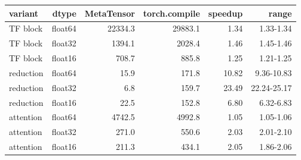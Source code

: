 \begin{tabular}{lrrrrr}
\toprule
variant & dtype & MetaTensor & torch.compile & speedup & range \\
\midrule
TF block & float64 & 22334.3 & 29883.1 & 1.34 & 1.33-1.34 \\
TF block & float32 & 1394.1 & 2028.4 & 1.46 & 1.45-1.46 \\
TF block & float16 & 708.7 & 885.8 & 1.25 & 1.21-1.25 \\
reduction & float64 & 15.9 & 171.8 & 10.82 & 9.36-10.83 \\
reduction & float32 & 6.8 & 159.7 & 23.49 & 22.24-25.17 \\
reduction & float16 & 22.5 & 152.8 & 6.80 & 6.32-6.83 \\
attention & float64 & 4742.5 & 4992.8 & 1.05 & 1.05-1.06 \\
attention & float32 & 271.0 & 550.6 & 2.03 & 2.01-2.10 \\
attention & float16 & 211.3 & 434.1 & 2.05 & 1.86-2.06 \\
\bottomrule
\end{tabular}
